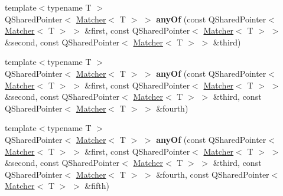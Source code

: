 \begin{DoxyCompactItemize}
\item 
\hypertarget{namespace_hamcrest_qt_a1849e87c7501720cdda6f61640eb99c2}{{\footnotesize template$<$typename T $>$ }\\Q\-Shared\-Pointer$<$ \hyperlink{class_hamcrest_qt_1_1_matcher}{Matcher}$<$ T $>$ $>$ {\bfseries any\-Of} (const Q\-Shared\-Pointer$<$ \hyperlink{class_hamcrest_qt_1_1_matcher}{Matcher}$<$ T $>$ $>$ \&first, const Q\-Shared\-Pointer$<$ \hyperlink{class_hamcrest_qt_1_1_matcher}{Matcher}$<$ T $>$ $>$ \&second, const Q\-Shared\-Pointer$<$ \hyperlink{class_hamcrest_qt_1_1_matcher}{Matcher}$<$ T $>$ $>$ \&third)}\label{namespace_hamcrest_qt_a1849e87c7501720cdda6f61640eb99c2}

\item 
\hypertarget{namespace_hamcrest_qt_a8e62bf0eb93327418df0aae733e36f73}{{\footnotesize template$<$typename T $>$ }\\Q\-Shared\-Pointer$<$ \hyperlink{class_hamcrest_qt_1_1_matcher}{Matcher}$<$ T $>$ $>$ {\bfseries any\-Of} (const Q\-Shared\-Pointer$<$ \hyperlink{class_hamcrest_qt_1_1_matcher}{Matcher}$<$ T $>$ $>$ \&first, const Q\-Shared\-Pointer$<$ \hyperlink{class_hamcrest_qt_1_1_matcher}{Matcher}$<$ T $>$ $>$ \&second, const Q\-Shared\-Pointer$<$ \hyperlink{class_hamcrest_qt_1_1_matcher}{Matcher}$<$ T $>$ $>$ \&third, const Q\-Shared\-Pointer$<$ \hyperlink{class_hamcrest_qt_1_1_matcher}{Matcher}$<$ T $>$ $>$ \&fourth)}\label{namespace_hamcrest_qt_a8e62bf0eb93327418df0aae733e36f73}

\item 
\hypertarget{namespace_hamcrest_qt_a55adc1b8685bb4cac50aa602d03c200d}{{\footnotesize template$<$typename T $>$ }\\Q\-Shared\-Pointer$<$ \hyperlink{class_hamcrest_qt_1_1_matcher}{Matcher}$<$ T $>$ $>$ {\bfseries any\-Of} (const Q\-Shared\-Pointer$<$ \hyperlink{class_hamcrest_qt_1_1_matcher}{Matcher}$<$ T $>$ $>$ \&first, const Q\-Shared\-Pointer$<$ \hyperlink{class_hamcrest_qt_1_1_matcher}{Matcher}$<$ T $>$ $>$ \&second, const Q\-Shared\-Pointer$<$ \hyperlink{class_hamcrest_qt_1_1_matcher}{Matcher}$<$ T $>$ $>$ \&third, const Q\-Shared\-Pointer$<$ \hyperlink{class_hamcrest_qt_1_1_matcher}{Matcher}$<$ T $>$ $>$ \&fourth, const Q\-Shared\-Pointer$<$ \hyperlink{class_hamcrest_qt_1_1_matcher}{Matcher}$<$ T $>$ $>$ \&fifth)}\label{namespace_hamcrest_qt_a55adc1b8685bb4cac50aa602d03c200d}


\end{DoxyCompactItemize}
